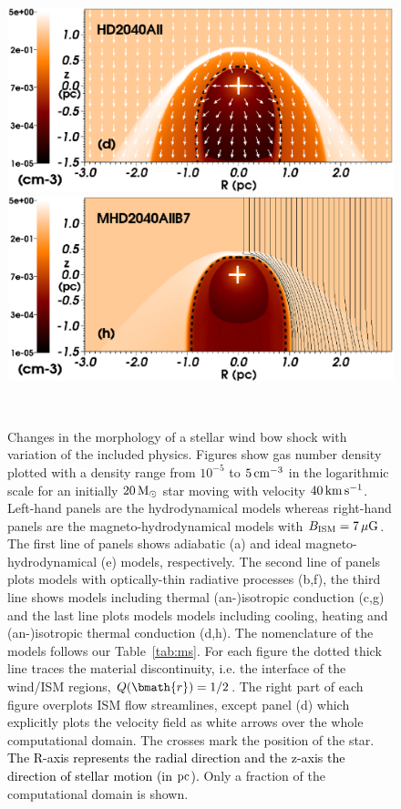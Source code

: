 \documentclass[useAMS,usenatbib]{mn2e}
\begin{document}
\begin{figure}
	\begin{minipage}[b]{ 0.48\textwidth}
		\includegraphics[width=1.0\textwidth]{./streamlines_map_20_Mo_40kms_MS_hdall_legend.eps}
	\end{minipage}
	\begin{minipage}[b]{ 0.48\textwidth}
 		\includegraphics[width=1.0\textwidth]{./streamlines_map_20_Mo_40kms_MS_mhdall_legend.eps}
	\end{minipage} \\ 	
	\caption{   
	Changes in the morphology of a stellar wind bow shock with variation of
the included physics. Figures show gas number density plotted with a density
range from $10^{-5}$ to $5\, \rm cm^{-3}$ in the logarithmic scale for an
initially $20\, \rm M_{\odot}$ star moving with velocity $40\, \rm km\, \rm
s^{-1}$. Left-hand panels are the hydrodynamical models whereas right-hand
panels are the magneto-hydrodynamical models with $B_{\rm ISM}=7\, \rm \mu G$.
The first line of panels shows adiabatic (a) and ideal magneto-hydrodynamical
(e) models, respectively. The second line of panels plots models with optically-thin 
radiative processes (b,f), the third line shows models including thermal (an-)isotropic
conduction (c,g) and the last line plots models models including cooling,
heating and (an-)isotropic thermal conduction (d,h). The nomenclature of the
models follows our Table~\ref{tab:ms}. For
each figure the dotted thick line traces the material discontinuity, i.e. 
the interface of the wind/ISM regions, $Q(\bmath{r})=1/2$. The right part of each figure overplots ISM flow
streamlines, except panel (d) which explicitly plots the velocity 
field as white arrows over the whole computational domain. 
The crosses mark the position of the star. 
\textcolor{black}{ The R-axis represents the radial direction and the z-axis 
the direction of stellar motion (in $\rm pc$).}
Only a fraction of the computational domain is shown.
		 }
	\label{fig:physics}  
\end{figure}
\end{document}
